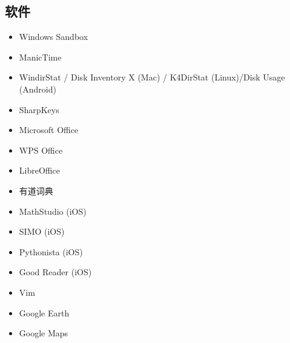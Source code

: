 \subsection{软件}
\begin{itemize}
\item Windows Sandbox
\item ManicTime
\item WindirStat / Disk Inventory X (Mac) / K4DirStat (Linux)/Disk Usage (Android)
\item SharpKeys
\item Microsoft Office
\item WPS Office
\item LibreOffice
\item 有道词典
\item MathStudio (iOS)
\item SIMO (iOS)
\item Pythonista (iOS)
\item Good Reader (iOS)
\item Vim
\item Google Earth
\item Google Maps
\end{itemize}

